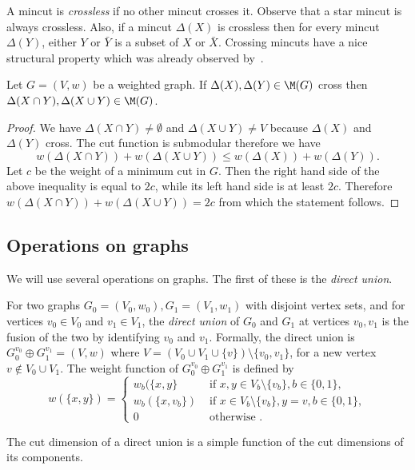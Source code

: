 A mincut is {\em crossless} if no other
mincut crosses it. Observe that a star mincut is always crossless.
Also, if a  mincut $\Delta(X)$ is crossless then
for every mincut $\Delta(Y)$, either $Y$ or $\bar{Y}$ is a subset of $X$ or $\bar{X}$.
Crossing mincuts have a nice structural property which was already observed by~\cite{DKL76}.

\begin{claim}
\label{claim:mincuts}
Let $G=(V,w)$ be a weighted graph.
If $\Delta(X), \Delta(Y) \in \M(G)$ cross then
$\Delta(X \cap Y), \Delta(X \cup Y)  \in \M(G)$.
\end{claim}

\begin{proof}
We have $\Delta(X \cap Y) \neq \emptyset $ and $ \Delta(X \cup Y) \neq V$ because $\Delta(X)$ and $\Delta(Y)$ cross. The cut function is submodular therefore we have
\begin{equation*}
\label{eq:mincuts}
w(\Delta(X \cap Y) ) + w(\Delta(X \cup Y) ) \leq w(\Delta(X)) + w(\Delta(Y)).
\end{equation*}
Let $c$ be the weight of a minimum cut in $G$. Then the right hand side of the above inequality
is equal to $2c$, while its left hand side is at least $2c$. Therefore
$w(\Delta(X \cap Y) ) + w(\Delta(X \cup Y) ) = 2c$ from which the statement follows.
\end{proof}

\subsection{Operations on graphs}
We will use several operations on graphs.  The first of these is the \emph{direct union}.
\begin{definition}
\label{def:du}
For two graphs $G_0= (V_0, w_0), G_1 = (V_1,w_1)$
with disjoint vertex sets,
and for vertices $v_0 \in V_0$ and $v_1 \in V_1$, the {\em direct union} of $G_0$ and $G_1$ at vertices
$v_0,v_1$ is the fusion of the two by identifying $v_0$ and $v_1$. Formally, the direct union is
$G_0^{v_0} \oplus   G_1^{v_1} = (V,w)$
where $V = ( V_0 \cup V_1 \cup \{v\} ) \setminus \{v_0,v_1\}$, for a new vertex
$v \not\in V_0 \cup V_1 $. The weight function  of $G_0^{v_0} \oplus   G_1^{v_1}$
is defined by
\begin{equation*}
w (\{x,y\}) =
\begin{cases}
w_b (\{x,y\}  & \text{ if } x,y \in V_b \setminus \{v_b\}, b\in \{0,1\}, \\
w_b(\{x,v_b\}) & \text{ if } x\in V_b \setminus \{v_b\}, y=v, b\in \{0,1\}, \\
0 &  \text{ otherwise }.
\end{cases}
\end{equation*}
\end{definition}
The cut dimension of a direct union is a simple function of the cut dimensions of its components.


